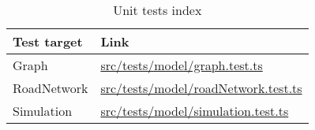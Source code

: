     \begin{table}
        \begin{tabular}{|p{}|p{}|}
            \hline
            \textbf{Test target} & \textbf{Link}\\\hline
            Graph & \href{https://github.com/joshua-smart/traffic-simulator/blob/main/src/tests/model/graph.test.ts}{src/tests/model/graph.test.ts}\\\hline
            RoadNetwork & \href{https://github.com/joshua-smart/traffic-simulator/blob/main/src/tests/model/roadNetwork.test.ts}{src/tests/model/roadNetwork.test.ts}\\\hline
            Simulation & \href{https://github.com/joshua-smart/traffic-simulator/blob/main/src/tests/model/simulation.test.ts}{src/tests/model/simulation.test.ts}\\\hline
        \end{tabular}
        \caption{Unit tests index}
        \label{tests-index}
    \end{table}
